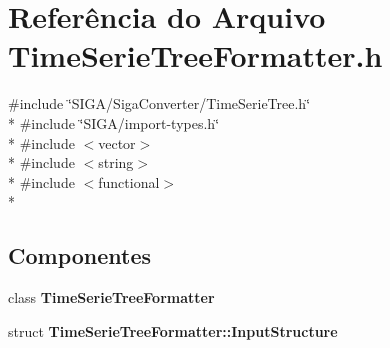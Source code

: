 \section{Referência do Arquivo Time\+Serie\+Tree\+Formatter.\+h}
\label{_time_serie_tree_formatter_8h}
{\ttfamily \#include \char`\"{}S\+I\+G\+A/\+Siga\+Converter/\+Time\+Serie\+Tree.\+h\char`\"{}}\\*
{\ttfamily \#include \char`\"{}S\+I\+G\+A/import-\/types.\+h\char`\"{}}\\*
{\ttfamily \#include $<$vector$>$}\\*
{\ttfamily \#include $<$string$>$}\\*
{\ttfamily \#include $<$functional$>$}\\*
\subsection*{Componentes}
\begin{DoxyCompactItemize}
\item 
class {\bf Time\+Serie\+Tree\+Formatter}
\item 
struct {\bf Time\+Serie\+Tree\+Formatter\+::\+Input\+Structure}
\end{DoxyCompactItemize}

